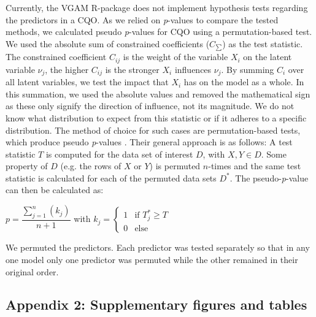 \documentclass[a4paper,11pt]{article}
\begin{document}
    Currently, the VGAM R-package \citep[Version 1.1-1,][]{VGAM19} does not implement hypothesis tests regarding the predictors in a CQO. 
    As we relied on \textit{p}-values to compare the tested methods, we calculated pseudo \textit{p}-values for CQO using a permutation-based test. 
    We used the absolute sum of constrained coefficients ($ C_{\sum} $) as the test statistic.
    The constrained coefficient $C_{ij}$ is the weight of the variable $X_i$ on the latent variable $\nu_j$, the higher $C_{ij}$ is the stronger $X_i$ influences $\nu_j$. 
    By summing $C_{i}$ over all latent variables, we test the impact that $X_i$ has on the model as a whole. 
    In this summation, we used the absolute values and removed the mathematical sign as these only signify the direction of influence, not its magnitude. 
    We do not know what distribution to expect from this statistic or if it adheres to a specific distribution. 
    The method of choice for such cases are permutation-based tests, which produce pseudo \textit{p}-values \citep{Legendre2012}. 
    Their general approach is as follows: 
    A test statistic $T$ is computed for the data set of interest $D$, with $X,Y \in D$. 
    Some property of $D$ (e.g. the rows of $X$ or $Y$) is permuted $n$-times and the same test statistic is calculated for each of the permuted data sets $D^*$. 
    The pseudo-\textit{p}-value can then be calculated as: 
    \begin{center} 
    $p = \displaystyle \dfrac{\sum_{j=1}^n(k_j)}{n + 1}$ \hspace{1cm} 
    with 
    \hspace{1cm} $k_j = \begin{cases} 1 &\text{if\ $T^*_j \ge T$} \\ 0 & \text{else} \end{cases}$\\ 
    \end{center}

    We permuted the predictors. 
    Each predictor was tested separately so that in any one model only one predictor was permuted while the other remained in their original order. 

\subsection*{Appendix 2: Supplementary figures and tables}   
		
\end{document}
